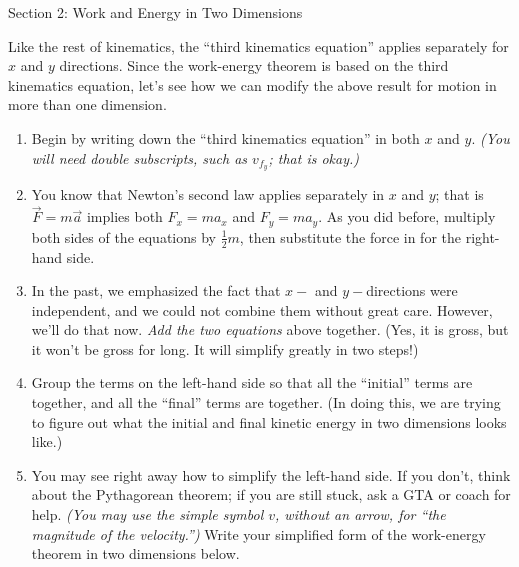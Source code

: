 \documentclass[12pt]{article}
\begin{document}
\newpage


{\Large Section 2: Work and Energy in Two Dimensions}

 Like the rest of kinematics, the ``third kinematics equation'' applies separately for $x$ and $y$ directions. Since the work-energy theorem is based on the third kinematics equation, let's see how we can modify the above result for motion in more than one dimension.

\begin{enumerate}
\item Begin by writing down the ``third kinematics equation'' in both $x$ and $y$. {\it (You will need double subscripts, such as $v_{f_y}$; that is okay.)}

\vspace{1in}

\item You know that Newton's second law applies separately in $x$ and $y$; that is $\vec F = m \vec a$ implies both $F_x = m a_x$ and $F_y = m a_y$. As you did before, multiply both sides of the equations by $\frac {1}{2}m$, then substitute the force in for the right-hand side.

\vspace{1in}

\item In the past, we emphasized the fact that $x-$ and $y-$directions were independent, and we could not combine them without great care. However, we'll do that now. {\it Add the two equations} above together. (Yes, it is gross, but it won't be gross for long. It will simplify greatly in two steps!)
\vspace{1in}
\newpage

\item Group the terms on the left-hand side so that all the ``initial'' terms are together, and all the ``final'' terms are together. (In doing this, we are trying to figure out what the initial and final kinetic energy in two dimensions looks like.)

\vspace{1.5in}

\item You may see right away how to simplify the left-hand side. If you don't, think about the Pythagorean theorem; if you are still stuck, ask a GTA or coach for help. {\it (You may use the simple symbol $v$, without an arrow, for ``the magnitude of the velocity.'')} Write your simplified form of the work-energy theorem in two dimensions below. 


\end{enumerate}
\end{document}
